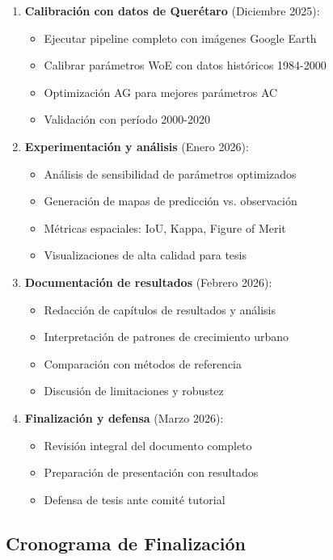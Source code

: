 \documentclass[12pt,letterpaper]{article}
\begin{document}
\begin{enumerate}
\item \textbf{Calibración con datos de Querétaro} (Diciembre 2025):
    \begin{itemize}
    \item Ejecutar pipeline completo con imágenes Google Earth
    \item Calibrar parámetros WoE con datos históricos 1984-2000
    \item Optimización AG para mejores parámetros AC
    \item Validación con período 2000-2020
    \end{itemize}

\item \textbf{Experimentación y análisis} (Enero 2026):
    \begin{itemize}
    \item Análisis de sensibilidad de parámetros optimizados
    \item Generación de mapas de predicción vs. observación
    \item Métricas espaciales: IoU, Kappa, Figure of Merit
    \item Visualizaciones de alta calidad para tesis
    \end{itemize}

\item \textbf{Documentación de resultados} (Febrero 2026):
    \begin{itemize}
    \item Redacción de capítulos de resultados y análisis
    \item Interpretación de patrones de crecimiento urbano
    \item Comparación con métodos de referencia
    \item Discusión de limitaciones y robustez
    \end{itemize}

\item \textbf{Finalización y defensa} (Marzo 2026):
    \begin{itemize}
    \item Revisión integral del documento completo
    \item Preparación de presentación con resultados
    \item Defensa de tesis ante comité tutorial
    \end{itemize}
\end{enumerate}

\subsection{Cronograma de Finalización}
\end{document}
